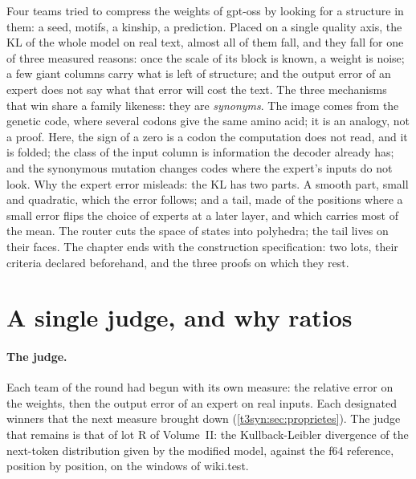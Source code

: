 \begin{enbref}
Four teams tried to compress the weights of gpt-oss by looking for a structure in them: a seed, motifs, a kinship, a prediction. Placed on a single quality axis, the KL of the whole model on real text, almost all of them fall, and they fall for one of three measured reasons: once the scale of its block is known, a weight is noise; a few giant columns carry what is left of structure; and the output error of an expert does not say what that error will cost the text. The three mechanisms that win share a family likeness: they are \emph{synonyms}. The image comes from the genetic code, where several codons give the same amino acid; it is an analogy, not a proof. Here, the sign of a zero is a codon the computation does not read, and it is folded; the class of the input column is information the decoder already has; and the synonymous mutation changes codes where the expert's inputs do not look. Why the expert error misleads: the KL has two parts. A smooth part, small and quadratic, which the error follows; and a tail, made of the positions where a small error flips the choice of experts at a later layer, and which carries most of the mean. The router cuts the space of states into polyhedra; the tail lives on their faces. The chapter ends with the construction specification: two lots, their criteria declared beforehand, and the three proofs on which they rest.
\end{enbref}

\section{A single judge, and why ratios}\label{t3syn:sec:juge}

\paragraph{The judge.} Each team of the round had begun with its own measure: the relative error on the weights, then the output error of an expert on real inputs. Each designated winners that the next measure brought down (\cref{t3syn:sec:proprietes}). The judge that remains is that of lot R of Volume~II: the Kullback-Leibler divergence \parencite{kullback1951} of the next-token distribution given by the modified model, against the f64 reference, position by position, on the windows of wiki.test.


